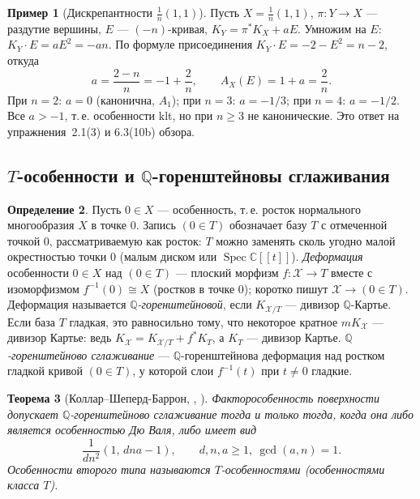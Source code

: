 \documentclass[11pt,a4paper]{article}
\theoremstyle{plain}
\newtheorem{theorem}{Теорема}[section]
\theoremstyle{definition}
\newtheorem{definition}[theorem]{Определение}
\newtheorem{example}[theorem]{Пример}
\theoremstyle{remark}
\renewcommand{\C}{\mathbb{C}}
\newcommand{\Q}{\mathbb{Q}}
\newcommand{\cX}{\mathcal{X}}
\DeclareMathOperator{\Spec}{Spec}
\begin{document}
\begin{example}[Дискрепантности $\frac1n(1,1)$]\label{ex:discrep-P11n}
Пусть $X=\frac1n(1,1)$, $\pi\colon Y\to X$ --- раздутие вершины, $E$ --- $(-n)$-кривая,
$K_Y=\pi^*K_X+aE$. Умножим на $E$: $K_Y\cdot E=aE^2=-an$. По формуле присоединения
$K_Y\cdot E=-2-E^2=n-2$, откуда
\[
a=\frac{2-n}n=-1+\frac2n,\qquad A_X(E)=1+a=\frac2n .
\]
При $n=2$: $a=0$ (канонична, $A_1$); при $n=3$: $a=-1/3$; при $n=4$: $a=-1/2$. Все $a>-1$,
т.\,е. особенности klt, но при $n\ge3$ не канонические. Это ответ на упражнения~2.1(3) и
6.3(10b) обзора.
\end{example}

\subsection{\texorpdfstring{$T$}{T}-особенности и \texorpdfstring{$\Q$}{Q}-горенштейновы сглаживания}\label{ss:T-sing}

\begin{definition}\label{def:QGor-smoothing}
Пусть $0\in X$ --- особенность, т.\,е. росток нормального многообразия $X$ в точке $0$. Запись
$(0\in T)$ обозначает базу $T$ с отмеченной точкой $0$, рассматриваемую как росток: $T$ можно
заменять сколь угодно малой окрестностью точки $0$ (малым диском или $\Spec\C[[t]]$).
\emph{Деформация} особенности $0\in X$ над $(0\in T)$ --- плоский морфизм $f\colon\cX\to T$ вместе
с изоморфизмом $f^{-1}(0)\cong X$ (ростков в точке $0$); коротко пишут $\cX\to(0\in T)$.
Деформация называется \emph{$\Q$-горенштейновой}, если $K_{\cX/T}$ --- дивизор $\Q$-Картье. Если
база $T$ гладкая, это равносильно тому, что некоторое кратное $mK_\cX$ --- дивизор Картье: ведь
$K_\cX=K_{\cX/T}+f^*K_T$, а $K_T$ --- дивизор Картье. \emph{$\Q$-горенштейново сглаживание} ---
$\Q$-горенштейнова деформация над ростком гладкой кривой $(0\in T)$, у которой слои $f^{-1}(t)$
при $t\ne0$ гладкие.
\end{definition}

\begin{theorem}[{Коллар--Шеперд-Баррон, \cite[3.10]{KSB}, \cite[\S\,2]{HP}}]\label{thm:KSB}
Факторособенность поверхности допускает $\Q$-горенштейново сглаживание тогда и только тогда, когда
она либо является особенностью Дю Валя, либо имеет вид
\[
\frac1{dn^2}(1,\,dna-1),\qquad d,n,a\ge1,\ \gcd(a,n)=1 .
\]
Особенности второго типа называются \emph{$T$-особенностями} \textup{(}\emph{особенностями класса $T$}\textup{)}.
\end{theorem}
\end{document}
